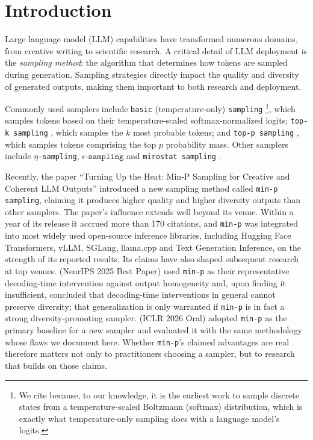 \section{Introduction}

Large language model (LLM) capabilities have transformed numerous domains, from creative writing to scientific research. A critical detail of LLM deployment is the \emph{sampling method}: the algorithm that determines how tokens are sampled during generation.
Sampling strategies directly impact the quality and diversity of generated outputs, making them important to both research and deployment.

Commonly used samplers include \texttt{basic} (temperature-only) \texttt{sampling} \citep{ackley1985learning}\footnote{We cite \citet{ackley1985learning} because, to our knowledge, it is the earliest work to sample discrete states from a temperature-scaled Boltzmann (softmax) distribution, which is exactly what temperature-only sampling does with a language model's logits.}, which samples tokens based on their temperature-scaled softmax-normalized logits; \texttt{top-k sampling} \citep{fan2018topk}, which samples the $k$ most probable tokens; and \texttt{top-p sampling} \citep{holtzman2020topp}, which samples tokens comprising the top $p$ probability mass. Other samplers include \texttt{$\eta$-sampling}, $\texttt{$\epsilon$-sampling}$ \citep{hewitt2022truncation} and \texttt{mirostat sampling} \citep{basu2020mirostat}.

Recently, the paper ``Turning Up the Heat: Min-P Sampling for Creative and Coherent LLM Outputs'' \citep{nguyen2024minp} introduced a new sampling method called \texttt{min-p sampling}, claiming it produces higher quality and higher diversity outputs than other samplers.
The paper's influence extends well beyond its venue. Within a year of its release it accrued more than 170 citations, and \texttt{min-p} was integrated into most widely used open-source inference libraries, including Hugging Face Transformers, vLLM, SGLang, llama.cpp and Text Generation Inference, on the strength of its reported results.
Its claims have also shaped subsequent research at top venues. \citet{jiang2025artificialhivemind} (NeurIPS 2025 Best Paper) used \texttt{min-p} as their representative decoding-time intervention against output homogeneity and, upon finding it insufficient, concluded that decoding-time interventions in general cannot preserve diversity; that generalization is only warranted if \texttt{min-p} is in fact a strong diversity-promoting sampler.
\citet{tan2025pless} (ICLR 2026 Oral) adopted \texttt{min-p} as the primary baseline for a new sampler and evaluated it with the same methodology whose flaws we document here.
Whether \texttt{min-p}'s claimed advantages are real therefore matters not only to practitioners choosing a sampler, but to research that builds on those claims.

